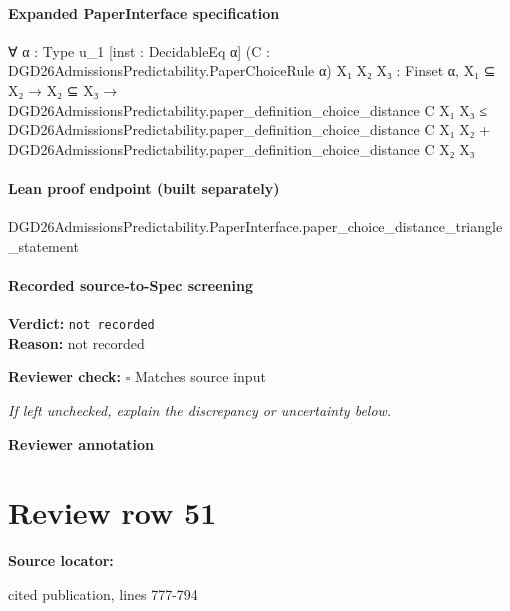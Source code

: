\documentclass[10pt]{article}
\newcommand{\reviewerbox}{%
  \par\noindent\fbox{\parbox{0.96\linewidth}{\rule{0pt}{0.38in}}}\par
}
\newcommand{\reviewmatch}[1]{%
  \par\noindent\textbf{Reviewer check:} $\square$\; #1\par
  \noindent\emph{If left unchecked, explain the discrepancy or uncertainty below.}\par
}
\begin{document}
\paragraph{Expanded PaperInterface specification}
\begin{ReviewVerbatim}
∀ {α : Type u_1} [inst : DecidableEq α] (C : DGD26AdmissionsPredictability.PaperChoiceRule α) {X₁ X₂ X₃ : Finset α},
  X₁ ⊆ X₂ →
    X₂ ⊆ X₃ →
      DGD26AdmissionsPredictability.paper_definition_choice_distance C X₁ X₃ ≤
        DGD26AdmissionsPredictability.paper_definition_choice_distance C X₁ X₂ +
          DGD26AdmissionsPredictability.paper_definition_choice_distance C X₂ X₃
\end{ReviewVerbatim}

\paragraph{Lean proof endpoint (built separately)}\begin{ReviewVerbatim}
DGD26AdmissionsPredictability.PaperInterface.paper_choice_distance_triangle_statement
\end{ReviewVerbatim}

\paragraph{Recorded source-to-Spec screening}
\textbf{Verdict:} \texttt{not recorded}
\\
\textbf{Reason:} not recorded
\reviewmatch{Matches source input}
\noindent\textbf{Reviewer annotation}\par
\reviewerbox
\clearpage
\hypertarget{source-claim-f8de55f9c5760a87}{}
\section*{Review row 51}
\textbf{Source locator:} {\footnotesize\raggedright cited publication, lines 777-\allowbreak{}794\par}
\end{document}
